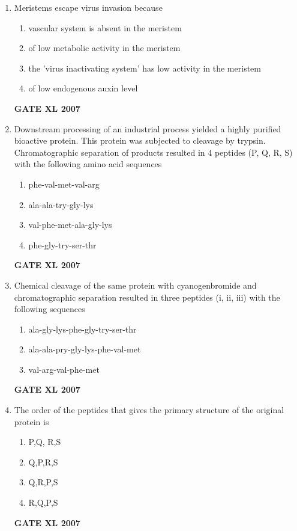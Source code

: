 \documentclass[journal,12pt,onecolumn]{IEEEtran}
\begin{document}
\begin{enumerate}
    \item Meristems escape virus invasion because
    \begin{enumerate}
        \item vascular system is absent in the meristem
        \item of low metabolic activity in the meristem
        \item the 'virus inactivating system' has low activity in the meristem
        \item of low endogenous auxin level
    \end{enumerate}
	    \hfill \textbf{GATE XL 2007}

    \item Downstream processing of an industrial process yielded a highly purified bioactive protein. This protein was subjected to cleavage by trypsin. Chromatographic separation of products resulted in 4 peptides (P, Q, R, S) with the following amino acid sequences
    \begin{enumerate}
        \item phe-val-met-val-arg
        \item ala-ala-try-gly-lys
        \item val-phe-met-ala-gly-lys
        \item phe-gly-try-ser-thr
    \end{enumerate}
	    \hfill \textbf{GATE XL 2007}
    \item Chemical cleavage of the same protein with cyanogenbromide and chromatographic separation resulted in three peptides (i, ii, iii) with the following sequences
    \begin{enumerate}
        \item ala-gly-lys-phe-gly-try-ser-thr
        \item ala-ala-pry-gly-lys-phe-val-met
        \item val-arg-val-phe-met
    \end{enumerate}
	    \hfill \textbf{GATE XL 2007}
    \item The order of the peptides that gives the primary structure of the original protein is
    \begin{enumerate}
        \item P,Q, R,S
        \item Q,P,R,S
        \item Q,R,P,S
        \item R,Q,P,S
    \end{enumerate}
	    \hfill \textbf{GATE XL 2007}



\end{enumerate}
\end{document}
